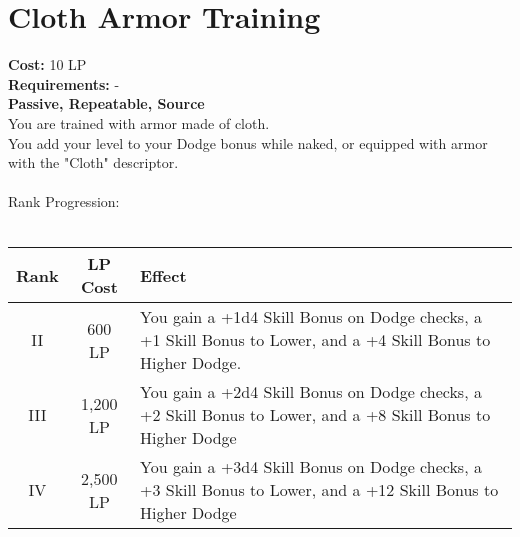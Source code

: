 \section{Cloth Armor Training}\label{perk:clothArmorTraining}
\textbf{Cost:} 10 LP\\
\textbf{Requirements:} -\\
\textbf{Passive, Repeatable, Source}\\
You are trained with armor made of cloth.\\
You add your level to your Dodge bonus while naked, or equipped with armor with the "Cloth" descriptor.\\
\\

Rank Progression:\\
\\
\begin{longtable}{c | c | p{6cm}}
    Rank & LP Cost  & Effect\\
    \hline
    II   & 600 LP   & You gain a +1d4 Skill Bonus on Dodge checks, a +1 Skill Bonus to Lower, and a +4 Skill Bonus to Higher Dodge. \\
    III  & 1,200 LP & You gain a +2d4 Skill Bonus on Dodge checks, a +2 Skill Bonus to Lower, and a +8 Skill Bonus to Higher Dodge  \\
    IV   & 2,500 LP & You gain a +3d4 Skill Bonus on Dodge checks, a +3 Skill Bonus to Lower, and a +12 Skill Bonus to Higher Dodge \\

\end{longtable}
